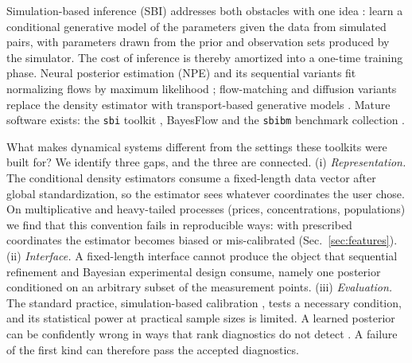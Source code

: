 \documentclass[10pt]{article}
\begin{document}
Simulation-based inference (SBI) addresses both obstacles with one idea \citep{cranmer2020}: learn a
conditional generative model of the parameters given the data from simulated pairs, with parameters
drawn from the prior and observation sets produced by the simulator. The cost of inference is thereby
amortized into a one-time training phase. Neural posterior estimation (NPE) and its sequential variants
fit normalizing flows by maximum likelihood \citep{papamakarios2016, greenberg2019}; flow-matching and
diffusion variants replace the density estimator with transport-based generative models
\citep{wildberger2023, gloeckler2024}. Mature software exists: the \texttt{sbi} toolkit
\citep{boelts2024}, BayesFlow \citep{radev2020} and the \texttt{sbibm} benchmark collection
\citep{lueckmann2021}.

What makes dynamical systems different from the settings these toolkits were built for? We identify
three gaps, and the three are connected. (i) \emph{Representation.} The conditional density estimators
consume a fixed-length data vector after global standardization, so the estimator sees whatever
coordinates the user chose. On multiplicative and heavy-tailed processes (prices, concentrations,
populations) we find that this convention fails in reproducible ways: with prescribed coordinates the
estimator becomes biased or mis-calibrated (Sec.~\ref{sec:features}). (ii) \emph{Interface.} A
fixed-length interface cannot produce the object that sequential refinement and Bayesian experimental
design consume, namely one posterior conditioned on an arbitrary subset of the measurement points.
(iii) \emph{Evaluation.} The standard practice, simulation-based calibration \citep{talts2018}, tests a
necessary condition, and its statistical power at practical sample sizes is limited. A learned
posterior can be confidently wrong in ways that rank diagnostics do not detect \citep{hermans2022}. A
failure of the first kind can therefore pass the accepted diagnostics.
\end{document}
